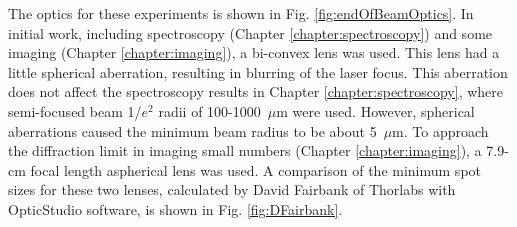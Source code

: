 The optics for these experiments is shown in Fig. \ref{fig:endOfBeamOptics}.  In initial work, including spectroscopy (Chapter \ref{chapter:spectroscopy}) and some imaging (Chapter \ref{chapter:imaging}), a bi-convex lens was used.  This lens had a little spherical aberration, resulting in blurring of the laser focus.  This aberration does not affect the spectroscopy results in Chapter \ref{chapter:spectroscopy}, where semi-focused beam 1/$e^{2}$ radii of 100-1000~$\mu$m were used.  However, spherical aberrations caused the minimum beam radius to be about 5~$\mu$m.  To approach the diffraction limit in imaging small numbers (Chapter \ref{chapter:imaging}), a 7.9-cm focal length aspherical lens was used.  A comparison of the minimum spot sizes for these two lenses, calculated by David Fairbank of Thorlabs with OpticStudio software, is shown in Fig. \ref{fig:DFairbank}.

